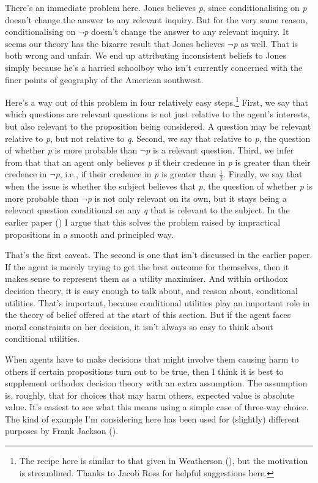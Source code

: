 \documentclass[
  10pt,
  letterpaper,
  DIV=11,
  numbers=noendperiod,
  twoside]{scrartcl}
\begin{document}
There's an immediate problem here. Jones believes \emph{p}, since
conditionalising on \emph{p} doesn't change the answer to any relevant
inquiry. But for the very same reason, conditionalising on
\(\neg\)\emph{p} doesn't change the answer to any relevant inquiry. It
seems our theory has the bizarre result that Jones believes
\(\neg\)\emph{p} as well. That is both wrong and unfair. We end up
attributing inconsistent beliefs to Jones simply because he's a harried
schoolboy who isn't currently concerned with the finer points of
geography of the American southwest.

Here's a way out of this problem in four relatively easy
steps.\footnote{The recipe here is similar to that given in Weatherson
  (), but the motivation is
  streamlined. Thanks to Jacob Ross for helpful suggestions here.}
First, we say that which questions are relevant questions is not just
relative to the agent's interests, but also relevant to the proposition
being considered. A question may be relevant relative to \emph{p}, but
not relative to \emph{q}. Second, we say that relative to \emph{p}, the
question of whether \emph{p} is more probable than \(\neg\)\emph{p} is a
relevant question. Third, we infer from that that an agent only believes
\emph{p} if their credence in \emph{p} is greater than their credence in
\(\neg\)\emph{p}, i.e., if their credence in \emph{p} is greater than
\(\frac{1}{2}\). Finally, we say that when the issue is whether the
subject believes that \emph{p}, the question of whether \emph{p} is more
probable than \(\neg\)\emph{p} is not only relevant on its own, but it
stays being a relevant question conditional on any \emph{q} that is
relevant to the subject. In the earlier paper
() I argue that
this solves the problem raised by impractical propositions in a smooth
and principled way.

That's the first caveat. The second is one that isn't discussed in the
earlier paper. If the agent is merely trying to get the best outcome for
themselves, then it makes sense to represent them as a utility
maximiser. And within orthodox decision theory, it is easy enough to
talk about, and reason about, conditional utilities. That's important,
because conditional utilities play an important role in the theory of
belief offered at the start of this section. But if the agent faces
moral constraints on her decision, it isn't always so easy to think
about conditional utilities.

When agents have to make decisions that might involve them causing harm
to others if certain propositions turn out to be true, then I think it
is best to supplement orthodox decision theory with an extra assumption.
The assumption is, roughly, that for choices that may harm others,
expected value is absolute value. It's easiest to see what this means
using a simple case of three-way choice. The kind of example I'm
considering here has been used for (slightly) different purposes by
Frank Jackson ().
\end{document}
